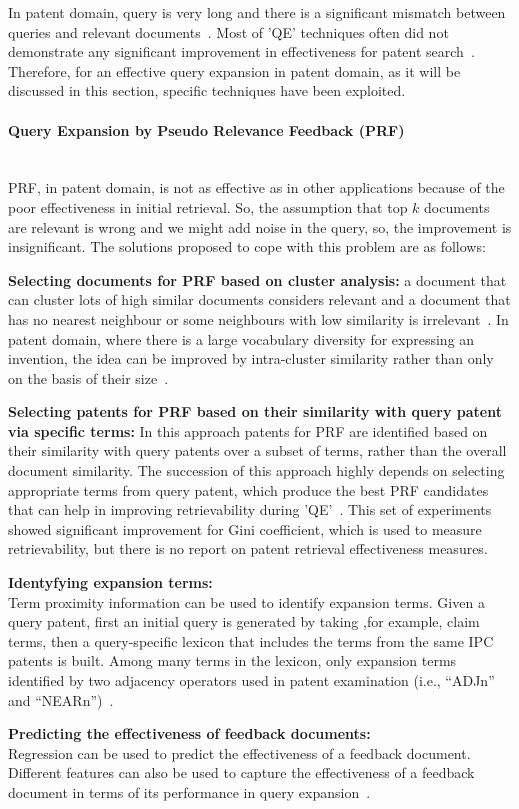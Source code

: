 In patent domain, query is very long and there is a significant mismatch between queries and relevant documents~\citep{roda2010clef, magdy2010exploring}. Most of 'QE' techniques often did not demonstrate any significant improvement in effectiveness for patent search~\citep{kishida2003experiment, konishi2005query}. Therefore, for an effective query expansion in patent domain, as it will be discussed in this section, specific techniques have been exploited.
\paragraph{Query Expansion by Pseudo Relevance Feedback (PRF)}
\ \\
PRF, in patent domain, is not as effective as in other applications because of the poor effectiveness in initial retrieval. So, the assumption that top $ k $ documents are relevant is wrong and we might add noise in the query, so, the improvement is insignificant. The solutions proposed to cope with this problem are as follows:
\begin{list}{-}{}
\item \textbf{Selecting documents for PRF based on cluster analysis:} a document that can cluster lots of high similar documents considers relevant and a document that has no nearest neighbour or some neighbours with low similarity is irrelevant~\citep{lee2008cluster}. In patent domain, where there is a large vocabulary diversity for expressing an invention, the idea can be improved by intra-cluster similarity rather than only on the basis of their size~\citep{bashir2009improving}. 
\item \textbf{Selecting patents for PRF based on their similarity with query patent via specific terms:} In this approach patents for PRF are identified based on their similarity with query patents over a subset of terms, rather than the overall document similarity. The succession of this approach highly depends on selecting appropriate terms from query patent, which produce the best PRF candidates that can help in improving retrievability during 'QE'~\citep{bashir2010improving}. This set of experiments showed significant improvement for Gini coefficient, which is used to measure retrievability, but there is no report on patent retrieval effectiveness measures.
\item \textbf{Identyfying expansion terms: } 
\ \\
Term proximity information can be used to identify expansion terms. Given a query patent, first an initial query is generated by taking ,for example, claim terms, then a query-specific lexicon that includes the terms from the same IPC patents is  built. Among many terms in the lexicon, only expansion terms identified by two adjacency operators used in patent examination (i.e., “ADJn” and “NEARn”)~\citep{mahdabi2013leveraging}.
\item \textbf{Predicting the effectiveness of feedback documents: } 
\ \\
Regression can be used to predict the effectiveness of a feedback document. Different features can also be used to capture the effectiveness of a feedback document in terms of its performance in query expansion~\citep{mahdabi2012learning}.
\end{list}
